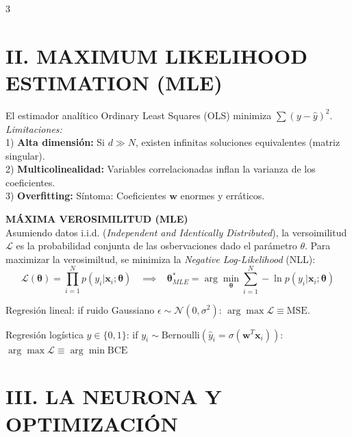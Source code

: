\documentclass[8pt,a4paper,landscape,fleqn]{extarticle}
\begin{document}
\begin{multicols*}{3}
\section{II. MAXIMUM LIKELIHOOD ESTIMATION (MLE)}

El estimador analítico Ordinary Least Squares (OLS) minimiza $\sum (y-\hat{y})^2$. \textit{Limitaciones:}\\
1) \textbf{Alta dimensión:} Si $d \gg N$, existen infinitas soluciones equivalentes (matriz singular).\\
2) \textbf{Multicolinealidad:} Variables correlacionadas inflan la varianza de los coeficientes.\\
3) \textbf{Overfitting:} Síntoma: Coeficientes $\bm{w}$ enormes y erráticos.

\textbf{MÁXIMA VEROSIMILITUD (MLE)}\\
Asumiendo datos i.i.d. (\textit{Independent and Identically Distributed}), la versoimilitud $\mathcal{L}$ es la probabilidad conjunta de las osbervaciones dado el parámetro $\theta$. Para maximizar la verosimiltud, se minimiza la \textit{Negative Log-Likelihood} (NLL): $$\mathcal{L}(\bm{\theta}) = \prod_{i=1}^{N} p(y_i | \bm{x}_i; \bm{\theta})\;\;\;\implies \;\; \; \bm{\theta}^*_{MLE} = \arg\min_{\bm{\theta}} \sum_{i=1}^{N} -\ln p(y_i | \bm{x}_i; \bm{\theta})$$


Regresión lineal: if ruido Gaussiano $\epsilon \sim \mathcal{N}(0, \sigma^2)$: $\arg\max \mathcal{L}\equiv \text{MSE}$.


Regresión logística $y \in\{0,1\}$: if $y_i\!\sim \!\text{Bernoulli}(\hat{y}_i= \sigma(\bm{w}^T\bm{x}_i))$: $\arg\max \mathcal{L} \equiv \arg\min \text{BCE}$


\section{III. LA NEURONA Y OPTIMIZACIÓN}


\end{multicols*}
\end{document}
